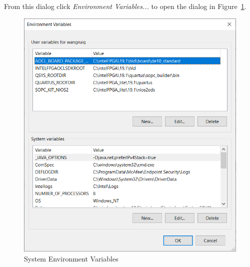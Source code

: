 \documentclass[11pt, twoside, pdftex]{article}
\begin{document}
From this dialog click \textit{Environment Variables...} to open the dialog in Figure~\ref{fig:env_vars}.
	\begin{figure} [H]
	\begin{center}
	\includegraphics[scale = 0.7]{figures/fig_env_vars.PNG}
	\end{center}
	\caption{System Environment Variables}
	\label{fig:env_vars}
	\end{figure}
	
\end{document}
